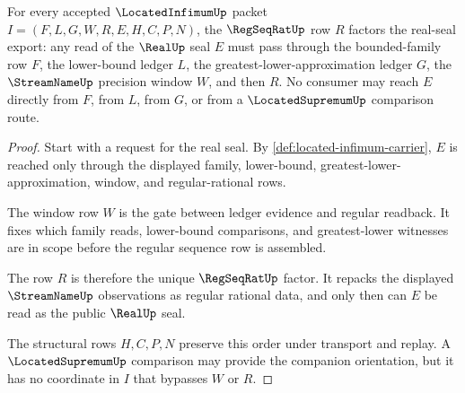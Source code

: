 \begin{theorem}
\label{thm:located-infimum-regseqrat-seal-factorization}
For every accepted $\LocatedInfimumUp$ packet $I=(F,L,G,W,R,E,H,C,P,N)$, the $\RegSeqRatUp$ row $R$ factors the real-seal export: any read of the $\RealUp$ seal $E$ must pass through the bounded-family row $F$, the lower-bound ledger $L$, the greatest-lower-approximation ledger $G$, the $\StreamNameUp$ precision window $W$, and then $R$. No consumer may reach $E$ directly from $F$, from $L$, from $G$, or from a $\LocatedSupremumUp$ comparison route.
\end{theorem}
\begin{proof}
Start with a request for the real seal. By \autoref{def:located-infimum-carrier}, $E$ is reached only through the displayed family, lower-bound, greatest-lower-approximation, window, and regular-rational rows.

The window row $W$ is the gate between ledger evidence and regular readback. It fixes which family reads, lower-bound comparisons, and greatest-lower witnesses are in scope before the regular sequence row is assembled.

The row $R$ is therefore the unique $\RegSeqRatUp$ factor. It repacks the displayed $\StreamNameUp$ observations as regular rational data, and only then can $E$ be read as the public $\RealUp$ seal.

The structural rows $H,C,P,N$ preserve this order under transport and replay. A $\LocatedSupremumUp$ comparison may provide the companion orientation, but it has no coordinate in $I$ that bypasses $W$ or $R$.
\end{proof}

